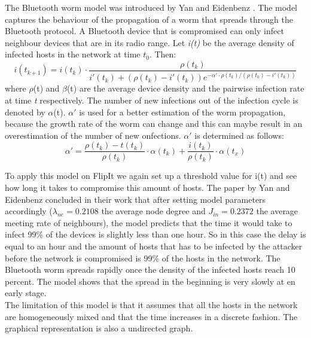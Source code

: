 The Bluetooth worm model was introduced by Yan and Eidenbenz \citep{yan2009modeling}. The model captures the behaviour of the propagation of a worm that spreads through the Bluetooth protocol. 
A Bluetooth device that is compromised can only infect neighbour devices that are in its radio range.
Let \textit{i(t)} be the average density of infected hosts in the network at time $t_{0}$. Then: 
\begin{equation}
i(t_{k+1})=i(t_{k}) \cdot \dfrac{\rho(t_{k})}{i'(t_{k}) + (\rho(t_{k}) - i'(t_{k}))e^{-\alpha' \cdot \rho(t_{k}) / (\rho(t_{k}) - i'(t_{k}))}}
\end{equation}
where $\rho$(t) and $\beta$(t) are the average device density and the pairwise infection rate at time \textit{t} respectively. The number of new infections out of the infection cycle is denoted by $\alpha$(t). $\alpha'$ is used for a better estimation of the worm propagation, because the growth rate of the worm can change and this can maybe result in an overestimation of the number of new onfections. $\alpha'$ is determined as follows:
\begin{equation}
\alpha'=\dfrac{\rho(t_{k})-t(t_{k})}{\rho(t_{k})} \cdot \alpha(t_{k}) + \dfrac{i(t_{k})}{\rho(t_{k})} \cdot \alpha(t_{x})
\end{equation}

To apply this model on FlipIt we again set up a threshold value for i(t) and see how long it takes to compromise this amount of hosts.  The paper by Yan and Eidenbenz concluded in their work that after setting model parameters accordingly ($\lambda_{ne} = 0.2108$ the average node degree and $J_{in}= 0.2372$ the average meeting rate of neighbours), the model predicts that the time it would take to infect 99$\%$ of the devices is slightly less than one hour. So in this case the delay is equal to an hour and the amount of hosts that has to be infected by the attacker before the network is compromised is 99$\%$ of the hosts in the network.
The Bluetooth worm spreads rapidly once the density of the infected hosts reach 10 percent. The model shows that the spread in the beginning is very slowly at en early stage.\\

The limitation of this model is that it assumes that all the hosts in the network are homogeneously mixed and that the time increases in a discrete fashion. The graphical representation is also a undirected graph.

